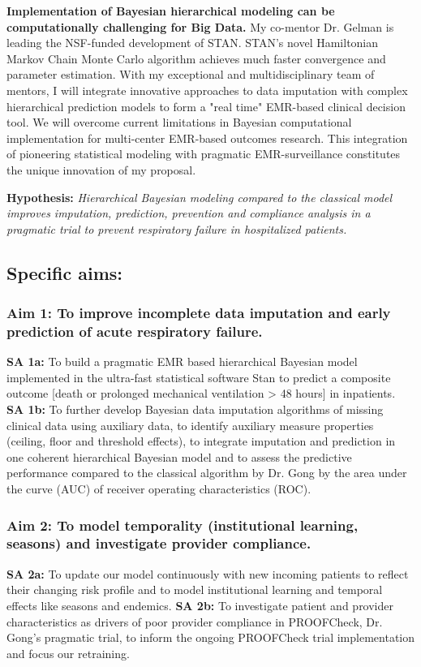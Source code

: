 \documentclass[11pt,notitlepage]{article}
\begin{document}
\newline \textbf{Implementation of Bayesian hierarchical modeling can be computationally challenging for Big Data.} My co-mentor Dr. Gelman is leading the NSF-funded development of STAN. STAN's novel Hamiltonian Markov Chain Monte Carlo algorithm achieves much faster convergence and parameter estimation. With my exceptional and multidisciplinary team of mentors, I will integrate innovative approaches to data imputation with complex hierarchical prediction models to form a "real time" EMR-based clinical decision tool. We will overcome current limitations in Bayesian computational implementation for multi-center EMR-based outcomes research. This integration of pioneering statistical modeling with pragmatic EMR-surveillance constitutes the unique innovation of my proposal.

\begin{flushleft}
\textbf{Hypothesis:} \textit{Hierarchical Bayesian modeling compared to the classical model improves imputation, prediction, prevention and compliance analysis in a pragmatic trial to prevent respiratory failure in hospitalized patients.}
\end{flushleft}

\subsection*{Specific aims:}

\subsubsection*{Aim 1: To improve incomplete data imputation and early prediction of acute respiratory failure.}
\textbf{SA 1a:} To build a pragmatic EMR based hierarchical Bayesian model implemented in the ultra-fast statistical software Stan to predict a composite outcome [death or prolonged mechanical ventilation > 48 hours] in inpatients. \newline \textbf{SA 1b:} To further develop Bayesian data imputation algorithms of missing clinical data using auxiliary data, to identify auxiliary measure properties (ceiling, floor and threshold effects), to integrate imputation and prediction in one coherent hierarchical Bayesian model and to assess the  predictive performance  compared to the classical algorithm by Dr. Gong by the area under the curve (AUC) of receiver operating characteristics (ROC).

\subsubsection*{Aim 2: To model temporality (institutional learning, seasons) and investigate provider compliance.}
\textbf{SA 2a:} To update our model continuously with new incoming patients to reflect their changing risk profile and to model institutional learning and temporal effects like seasons and endemics. 
\newline \textbf{SA 2b:} To investigate patient and provider characteristics as drivers of poor provider compliance in PROOFCheck, Dr. Gong's pragmatic trial, to inform the ongoing PROOFCheck trial implementation and focus our retraining. 
\end{document}
